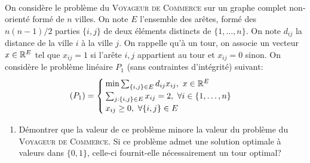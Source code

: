 \begin{td-exo}\,\\ %
    On considère le problème du \textsc{Voyageur de Commerce} sur un graphe complet non-orienté formé de \(n\) villes.
    On note \(E\) l'ensemble des arêtes, formé des \(n(n-1)/2\) parties \(\{i,j\}\) de deux éléments distincts de \(\{1,\ldots,n\}\).
    On note \(d_{ij}\) la distance de la ville \(i\) à la ville \(j\).
    On rappelle qu'à un tour, on associe un vecteur \(x\in \mathbb{R}^E\) tel que \(x_{ij} = 1\) si l'arête \({i,j}\) appartient au tour et \(x_{ij}=0\) sinon.
    On considère le problème linéaire \(P_1\) (sans contraintes d'intégrité) suivant:
    \begin{equation*}
        (P_1) = 
        \begin{cases}
            \min \sum_{\{i,j\}\in E} d_{ij} x_{ij},\ x\in\mathbb{R}^E\\
            \sum_{j:\{i,j\}\in E} x_{ij} = 2,\ \forall i \in \{1,\ldots,n\}\\
            x_{ij} \geq 0,\ \forall \{i,j\} \in E
        \end{cases}
    \end{equation*}
    \begin{enumerate}
        \item Démontrer que la valeur de ce problème minore la valeur du problème du \textsc{Voyageur de Commerce}.
        Si ce problème admet une solution optimale à valeurs dans \(\{0, 1\}\), celle-ci fournit-elle nécessairement un tour optimal?


\end{enumerate}
\end{td-exo}
